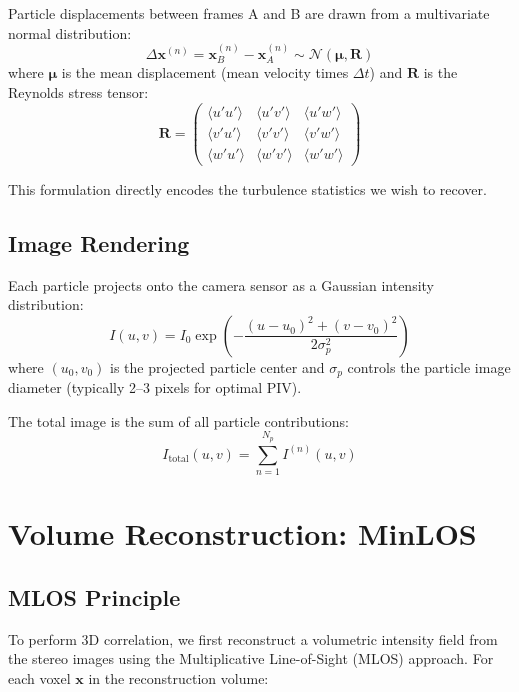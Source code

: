 \documentclass[11pt,a4paper]{article}
\begin{document}
Particle displacements between frames A and B are drawn from a multivariate normal distribution:
\begin{equation}
    \Delta\mathbf{x}^{(n)} = \mathbf{x}_B^{(n)} - \mathbf{x}_A^{(n)} \sim \mathcal{N}(\bm{\mu}, \mathbf{R})
\end{equation}
where $\bm{\mu}$ is the mean displacement (mean velocity times $\Delta t$) and $\mathbf{R}$ is the Reynolds stress tensor:
\begin{equation}
    \mathbf{R} = \begin{pmatrix}
        \langle u'u' \rangle & \langle u'v' \rangle & \langle u'w' \rangle \\
        \langle v'u' \rangle & \langle v'v' \rangle & \langle v'w' \rangle \\
        \langle w'u' \rangle & \langle w'v' \rangle & \langle w'w' \rangle
    \end{pmatrix}
\end{equation}

This formulation directly encodes the turbulence statistics we wish to recover.

\subsection{Image Rendering}

Each particle projects onto the camera sensor as a Gaussian intensity distribution:
\begin{equation}
    I(u, v) = I_0 \exp\left(-\frac{(u - u_0)^2 + (v - v_0)^2}{2\sigma_p^2}\right)
\end{equation}
where $(u_0, v_0)$ is the projected particle center and $\sigma_p$ controls the particle image diameter (typically 2--3 pixels for optimal PIV).

The total image is the sum of all particle contributions:
\begin{equation}
    I_{\text{total}}(u, v) = \sum_{n=1}^{N_p} I^{(n)}(u, v)
\end{equation}

\section{Volume Reconstruction: MinLOS}

\subsection{MLOS Principle}

To perform 3D correlation, we first reconstruct a volumetric intensity field from the stereo images using the Multiplicative Line-of-Sight (MLOS) approach. For each voxel $\mathbf{x}$ in the reconstruction volume:
\end{document}
